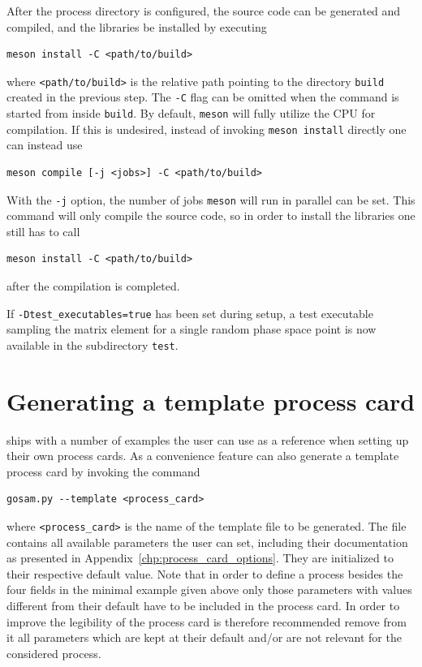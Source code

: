 After the process directory is configured, the \fortranXC source code can be generated and compiled, and the libraries be installed by executing
\begin{lstlisting}[style=sh]
meson install -C <path/to/build>
\end{lstlisting}
where \texttt{<path/to/build>} is the relative path pointing to the directory \texttt{build} created in the previous step. The \texttt{-C} flag can be omitted when the command is started from inside \texttt{build}. By default, \texttt{meson} will fully utilize the CPU for compilation. If this is undesired, instead of invoking \texttt{meson install} directly one can instead use
\begin{lstlisting}[style=sh]
meson compile [-j <jobs>] -C <path/to/build>
\end{lstlisting}
 With the \texttt{-j} option, the number of jobs \texttt{meson} will run in parallel can be set. This command will only compile the source code, so in order to install the libraries one still has to call
\begin{lstlisting}[style=sh]
meson install -C <path/to/build>
\end{lstlisting}
after the compilation is completed.

If \texttt{-Dtest\_executables=true} has been set during setup, a test executable sampling the matrix element for a single random phase space point is now available in the subdirectory \texttt{test}.

\section{Generating a template process card}
\gosam ships with a number of examples the user can
use as a reference when setting up their own process cards. As a convenience feature \gosam can also generate a template process card by invoking the command
\begin{lstlisting}[style=sh]
gosam.py --template <process_card>
\end{lstlisting}
where \texttt{<process\_card>} is the name of the template file to be generated. The file contains all available parameters the user can set, including their documentation as presented in Appendix~\ref{chp:process_card_options}. They are initialized to their respective default value. Note that in order to define a process besides the four fields in the minimal example given above only those parameters with values different from their default have to be included in the process card. In order to improve the legibility of the process card is therefore recommended remove from it all parameters which are kept at their default and/or are not relevant for the considered process.

